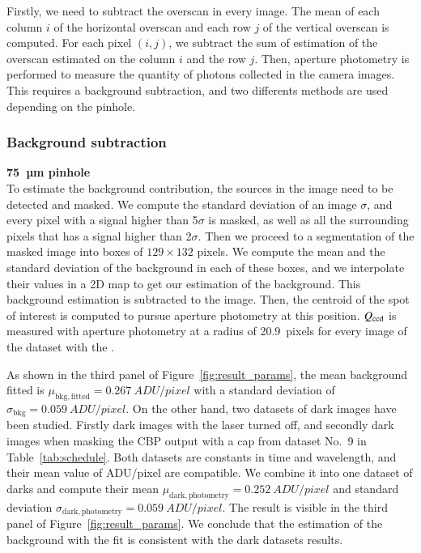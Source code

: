 Firstly, we need to subtract the overscan in every image. The mean of each column $i$ of the horizontal overscan and each row $j$ of the vertical overscan is computed. For each pixel $(i, j)$, we subtract the sum of estimation of the overscan estimated on the column $i$ and the row $j$.
Then, aperture photometry is performed to measure the quantity of photons collected in the \SD camera images. This requires a background subtraction, and two differents methods are used depending on the pinhole.

\subsubsection{Background subtraction}
\label{sec:bkg}

\textbf{75~µm pinhole} \\

To estimate the background contribution, the sources in the image need to be detected and masked. We compute the standard deviation of an image $\sigma$, and every pixel with a signal higher than 5$\sigma$ is masked, as well as all the surrounding pixels that has a signal higher than 2$\sigma$. Then we proceed to a segmentation of the masked image into boxes of $129\times132$ pixels. We compute the mean and the standard deviation of the background in each of these boxes, and we interpolate their values in a 2D map to get our estimation of the background. This background estimation is subtracted to the image. Then, the centroid of the spot of interest is computed to pursue aperture photometry at this position. $Q_{\mathrm{ccd}}$ is measured with aperture photometry at a radius of \SI{20.9}{pixels} for every image of the dataset with the \spinhole.

As shown in the third panel of Figure~\ref{fig:result_params}, the mean background fitted is $\mu_\mathrm{bkg, fitted}=\SI{0.267}{ADU/pixel}$ with a standard deviation of $\sigma_\mathrm{bkg}=\SI{0.059}{ADU/pixel}$. On the other hand, two datasets of dark images have been studied. Firstly dark images with the laser turned off, and secondly dark images when masking the CBP output with a cap from dataset No.~9 in Table~\ref{tab:schedule}. Both datasets are constants in time and wavelength, and their mean value of ADU/pixel are compatible. We combine it into one dataset of darks and compute their mean $\mu_\mathrm{dark, photometry}=\SI{0.252}{ADU/pixel}$ and standard deviation $\sigma_\mathrm{dark, photometry}=\SI{0.059}{ADU/pixel}$. The result is visible in the third panel of Figure~\ref{fig:result_params}. We conclude that the estimation of the background with the fit is consistent with the dark datasets results. \\

